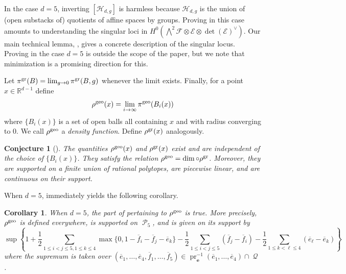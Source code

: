 \documentclass[11pt]{amsart}
\numberwithin{theorem}{section}
\numberwithin{equation}{section}
\newtheorem{coro}[theorem]{Corollary}
\newtheorem{conjecture}[theorem]{Conjecture}
\theoremstyle{definition}\newtheorem{defn}[theorem]{Definition}
\theoremstyle{definition}\newtheorem{remark}[theorem]{Remark}
\theoremstyle{definition}\newtheorem{question}[theorem]{Question}
\theoremstyle{definition}\newtheorem{problem}[theorem]{Problem}
\newcommand{\RR}{\mathbb{R}}
\newcommand{\cE}{\mathcal{E}}
\newcommand{\cF}{\mathcal{F}}
\DeclareMathOperator{\polytope}{\mathcal{P}}
\DeclareMathOperator{\qpolytope}{\mathcal{Q}}
\DeclareMathOperator{\pr}{pr}
\begin{document}
In the case $d = 5$, inverting $[\mathcal{H}_{d,g}]$ is harmless because $\mathcal{H}_{d,g}$ is the union of (open substacks of) quotients of affine spaces by groups. Proving  in this case amounts to understanding the singular loci in $H^0(\bigwedge^2 \cF \otimes \cE \otimes \det(\cE)^{\vee})$. Our main technical lemma, , gives a concrete description of the singular locus. Proving  in the case $d = 5$ is outside the scope of the paper, but we note that minimization is a promising direction for this.

Let $\pi^{\textnormal{gr}}(B) = \lim_{g \rightarrow 0}\pi^{\textnormal{gr}}(B,g)$ whenever the limit exists. Finally, for a point $x \in \RR^{d-1}$ define
\[
    \rho^{\textnormal{geo}}(x) = \lim_{i \rightarrow \infty}\pi^{\textnormal{geo}}(B_i(x))
\]
where $\{B_i(x)\}$ is a set of open balls all containing $x$ and with radius converging to $0$. We call $\rho^{\textnormal{geo}}$ a \emph{density function}. Define $\rho^{\textnormal{gr}}(x)$ analogously.

\begin{conjecture}[{\cite[Conjecture~8.11]{VV}}]
\label{conj:rho}
The quantities $\rho^{\textnormal{geo}}(x)$ and $\rho^{\textnormal{gr}}(x)$ exist and are independent of the choice of $\{B_i(x)\}$. They satisfy the relation $\rho^{\textnormal{geo}} = \dim \circ \rho^{\textnormal{gr}}$. Moreover, they are supported on a finite union of rational polytopes, are piecewise linear, and are continuous on their support.
\end{conjecture}

When $d = 5$,  immediately yields the following corollary. 

\begin{coro}
When $d = 5$, the part of  pertaining to $\rho^{\textnormal{geo}}$ is true. More precisely, $\rho^{\textnormal{geo}}$ is defined everywhere, is supported on $\polytope_5$, and is given on its support by
\[
 \sup \left\{ 1 + \frac{1}{2}\sum_{1 \leq i < j \leq 5, 1 \leq k \leq 4} \max\{0,1-\overline{f}_i - \overline{f}_j - \overline{e}_k\} - \frac{1}{2}\sum_{1 \leq i < j \leq 5}(\overline{f}_j - \overline{f}_i) - \frac{1}{2}\sum_{1 \leq k < \ell \leq 4}(\overline{e}_{\ell} - \overline{e}_k) \right \}
\]
where the supremum is taken over $(\overline{e}_1,\dots,\overline{e}_4,\overline{f}_1,\dots,\overline{f}_5) \in \pr_{\mathbf{e}}^{-1}(\overline{e}_1,\dots,\overline{e}_4) \cap \qpolytope$. 
\end{coro}
\end{document}
